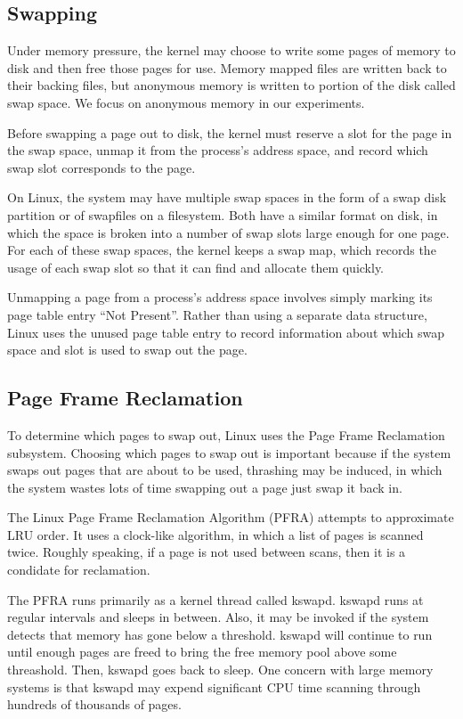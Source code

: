 \documentclass[twocolumn,11pt]{article}
\begin{document}
\subsection{Swapping}

Under memory pressure, the kernel may choose to write some pages of memory to
disk and then free those pages for use. Memory mapped files are written back to
their backing files, but anonymous memory is written to portion of the disk
called swap space. We focus on anonymous memory in our experiments.

Before swapping a page out to disk, the kernel must reserve a slot for the page
in the swap space, unmap it from the process's address space, and record which
swap slot corresponds to the page.

On Linux, the system may have multiple swap spaces in the form of a swap disk
partition or of swapfiles on a filesystem. Both have a similar format on disk,
in which the space is broken into a number of swap slots large enough for one
page. For each of these swap spaces, the kernel keeps a swap map, which records
the usage of each swap slot so that it can find and allocate them quickly.

Unmapping a page from a process's address space involves simply marking its page
table entry ``Not Present''. Rather than using a separate data structure, Linux
uses the unused page table entry to record information about which swap space
and slot is used to swap out the page.

\subsection{Page Frame Reclamation}

To determine which pages to swap out, Linux uses the Page Frame Reclamation
subsystem. Choosing which pages to swap out is important because if the system
swaps out pages that are about to be used, thrashing may be induced, in which
the system wastes lots of time swapping out a page just swap it back in.

The Linux Page Frame Reclamation Algorithm (PFRA) attempts to approximate LRU
order. It uses a clock-like algorithm, in which a list of pages is scanned
twice. Roughly speaking, if a page is not used between scans, then it is a
condidate for reclamation.

The PFRA runs primarily as a kernel thread called kswapd. kswapd runs at regular
intervals and sleeps in between. Also, it may be invoked if the system detects
that memory has gone below a threshold. kswapd will continue to run until enough
pages are freed to bring the free memory pool above some threashold. Then,
kswapd goes back to sleep.  One concern with large memory systems is that kswapd
may expend significant CPU time scanning through hundreds of thousands of pages.
\end{document}
